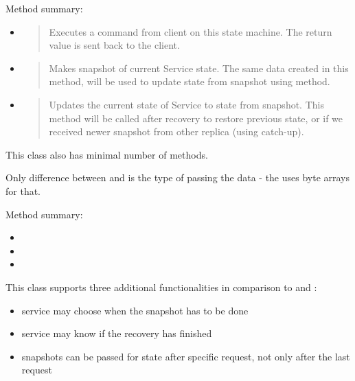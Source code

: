 Method summary:
\begin{itemize}
\item {} 
\begin{quote}

Executes a command from client on this state machine. The return value is sent back to the client.
\end{quote}

\item {} 
\begin{quote}

Makes snapshot of current Service state. The same data created in this method, will be used to update state from snapshot using  method.
\end{quote}

\item {} 
\begin{quote}

Updates the current state of Service to state from snapshot. This me\-thod will be called after recovery to restore previous state, or if we received newer snapshot from other replica (using catch-up).
\end{quote}

\end{itemize}


\label{api:simplifiedservice-class}
This class also has minimal number of methods.

Only difference between  and  is the type of passing the data - the  uses byte arrays for that.

Method summary:
\begin{itemize}
\item {} 

\item {} 

\item {} 

\end{itemize}


\label{api:abstractservice-class}
This class supports three additional functionalities in comparison to  and :
\begin{itemize}
\item {} 
service may choose when the snapshot has to be done

\item {} 
service may know if the recovery has finished

\item {} 
snapshots can be passed for state after specific request, not only after the last request

\end{itemize}

